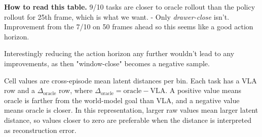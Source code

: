 \documentclass{article}
\begin{document}
\par\vspace{0.3em}
\noindent\small\textbf{How to read this table.} 9/10 tasks are closer to oracle rollout than the policy rollout for 25th frame, which is what we want. 
- Only \textit{drawer-close} isn't.
Improvement from the 7/10 on 50 frames ahead so this seems like a good action horizon.

Interestingly reducing the action horizon any further wouldn't lead to any improvements, as then "window-close" becomes a negative sample.

Cell values are cross-episode mean latent distances per bin. Each task has a VLA row and a \(\Delta_{\mathrm{oracle}}\) row, where \(\Delta_{\mathrm{oracle}} = \mathrm{oracle} - \mathrm{VLA}\). A positive value means oracle is farther from the world-model goal than VLA, and a negative value means oracle is closer. In this representation, larger raw values mean larger latent distance, so values closer to zero are preferable when the distance is interpreted as reconstruction error.







\end{document}
